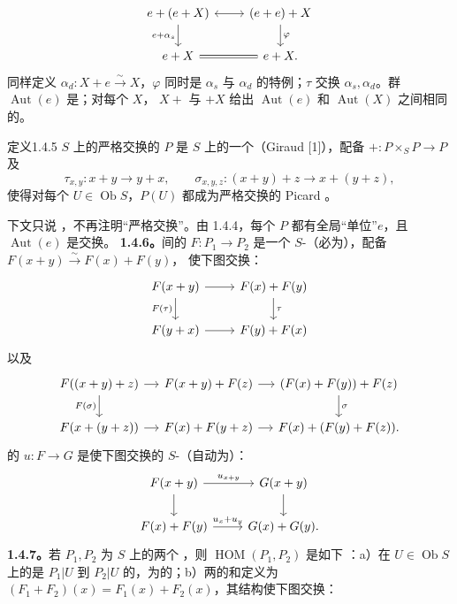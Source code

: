 \[\begin{tikzcd}
e+(e+X)\arrow[r,leftrightarrow]\arrow[d,"e+\alpha_s"']&(e+e)+X\arrow[d,"\varphi"]\\e+X\arrow[r,equal]&e+X.
\end{tikzcd}\]
同样定义 $\alpha_d:X+e\xrightarrow\sim X$，$\varphi$ 同时是 $\alpha_s$ 与 $\alpha_d$ 的特例；$\tau$ 交换 $\alpha_s,\alpha_d$。群 $\operatorname{Aut}(e)$ 是；对每个 $X$， $X+$ 与 $+X$ 给出 $\operatorname{Aut}(e)$ 和 $\operatorname{Aut}(X)$ 之间相同的。
\begin{SGAresult}{定义}{1.4.5}
 $S$ 上的严格交换的  $P$ 是 $S$ 上的一个（Giraud [1]），配备 $+:P\times_S P\to P$ 及
\[\tau_{x,y}:x+y\to y+x,\qquad\sigma_{x,y,z}:(x+y)+z\to x+(y+z),\]
使得对每个 $U\in\operatorname{Ob}S$，$P(U)$ 都成为严格交换的 Picard 。
\end{SGAresult}
下文只说 ，不再注明“严格交换”。由 1.4.4，每个  $P$ 都有全局“单位”$e$，且 $\operatorname{Aut}(e)$ 是交换。
\textbf{1.4.6。}间的 $F:P_1\to P_2$ 是一个 $S$-（必为），配备 $F(x+y)\xrightarrow\sim F(x)+F(y)$，
使下图交换：
\[\begin{tikzcd}F(x+y)\arrow[r]\arrow[d,"F(\tau)"']&F(x)+F(y)\arrow[d,"\tau"]\\F(y+x)\arrow[r]&F(y)+F(x)\end{tikzcd}\]
以及
\[\begin{tikzcd}[column sep=small]
F((x+y)+z)\arrow[r]\arrow[d,"F(\sigma)"']&F(x+y)+F(z)\arrow[r]&(F(x)+F(y))+F(z)\arrow[d,"\sigma"]\\
F(x+(y+z))\arrow[r]&F(x)+F(y+z)\arrow[r]&F(x)+(F(y)+F(z)).
\end{tikzcd}\]
的 $u:F\to G$ 是使下图交换的 $S$-（自动为）：
\[\begin{tikzcd}F(x+y)\arrow[r,"u_{x+y}"]\arrow[d]&G(x+y)\arrow[d]\\F(x)+F(y)\arrow[r,"u_x+u_y"]&G(x)+G(y).\end{tikzcd}\]
\textbf{1.4.7。}若 $P_1,P_2$ 为 $S$ 上的两个 ，则 $\operatorname{HOM}(P_1,P_2)$ 是如下 ：a）在 $U\in\operatorname{Ob}S$ 上的是 $P_1|U$ 到 $P_2|U$ 的，为的；b）两的和定义为 $(F_1+F_2)(x)=F_1(x)+F_2(x)$，其结构使下图交换：
